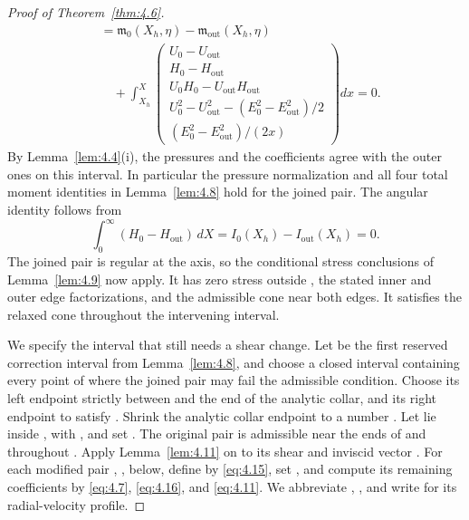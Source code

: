 \begin{proof}[Proof of Theorem~\ref{thm:4.6}]
\begin{align*}
&=\mathfrak m_0(X_h,\eta)-\mathfrak m_{\mathrm{out}}(X_h,\eta)\\
&\quad+\int_{X_h}^{X}
\begin{pmatrix}
U_0-U_{\mathrm{out}}\\
H_0-H_{\mathrm{out}}\\
U_0H_0-U_{\mathrm{out}}H_{\mathrm{out}}\\
U_0^2-U_{\mathrm{out}}^2-(E_0^2-E_{\mathrm{out}}^2)/2\\
(E_0^2-E_{\mathrm{out}}^2)/(2x)
\end{pmatrix}dx=0.
\end{align*}
By Lemma~\ref{lem:4.4}(i), the pressures and the coefficients
 agree with the
outer ones on this interval. In particular the pressure normalization and all four total moment
identities in Lemma~\ref{lem:4.8} hold for the joined pair. The angular identity follows from
\[
\int_0^\infty(H_0-H_{\mathrm{out}})\,dX
=I_0(X_h)-I_{\mathrm{out}}(X_h)=0.
\]
The joined pair is regular at the axis, so the conditional stress conclusions of
Lemma~\ref{lem:4.9} now apply. It has zero stress outside
, the stated inner and outer edge factorizations, and the
admissible cone near both edges. It satisfies the relaxed cone throughout the intervening interval.

We specify the interval that still needs a shear change. Let
 be the first reserved correction interval from
Lemma~\ref{lem:4.8}, and choose a closed interval
 containing
every point of  where the joined pair may fail the
admissible condition. Choose its left endpoint strictly between
 and the end of the analytic collar, and its right endpoint to satisfy
. Shrink the analytic collar
endpoint to a number . Let
 lie inside , with
, and set
. The original pair is admissible near the ends of
 and throughout
. Apply Lemma~\ref{lem:4.11} on
 to its shear
 and inviscid vector
. For each modified pair
, , below, define
 by \eqref{eq:4.15}, set
, and compute its remaining coefficients by
\eqref{eq:4.7}, \eqref{eq:4.16}, and \eqref{eq:4.11}. We abbreviate
, , and write
 for its radial-velocity profile.


\end{proof}
